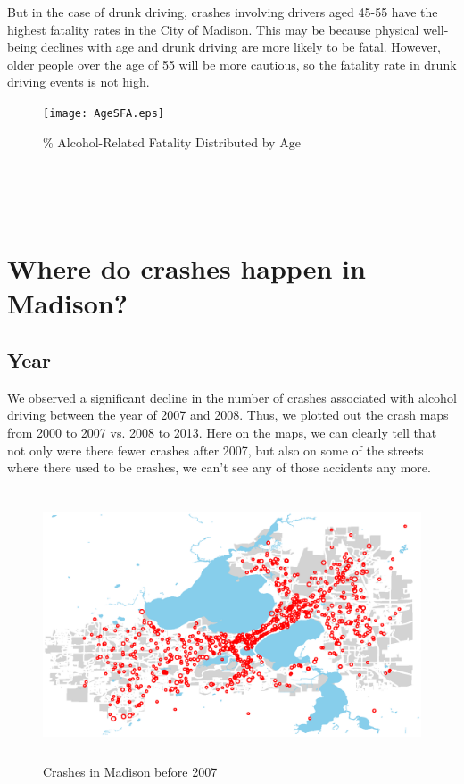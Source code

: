 \documentclass[15pt]{article}
\begin{document}
\newpage
But in the case of drunk driving, crashes involving drivers aged 45-55 have the highest fatality rates in the City of Madison. This may be because physical well-being declines with age and drunk driving are more likely to be fatal. However, older people over the age of 55 will be more cautious, so the fatality rate in drunk driving events is not high.
\begin{figure}[H]
\centering
\texttt{[image: AgeSFA.eps]}
\caption{\% Alcohol-Related Fatality Distributed by Age}
\label{22}
\end{figure}

~\\
~\\
~\\

\section{Where do crashes happen in Madison?}
\subsection{Year}
We observed a significant decline in the number of crashes associated with alcohol driving between the year of 2007 and 2008. Thus, we plotted out the crash maps from 2000 to 2007 vs. 2008 to 2013. Here on the maps, we can clearly tell that not only were there fewer crashes after 2007, but also on some of the streets where there used to be crashes, we can’t see any of those accidents any more.
\begin{figure}[H]
\raggedleft
\includegraphics[height=80mm]{year1.eps}
\caption{Crashes in Madison before 2007}
\end{figure}
\end{document}
